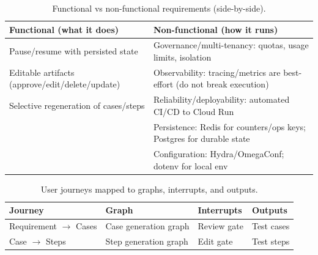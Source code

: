 \begin{table}[htbp]
    \centering
    \small
    \renewcommand{\arraystretch}{1.15}
    \begin{tabularx}{\textwidth}{@{}>{\raggedright\arraybackslash}p{}>{\raggedright\arraybackslash}X@{}}
        \toprule
        \textbf{Functional (what it does)}              & \textbf{Non-functional (how it runs)}                                   \\
        \midrule
        Pause/resume with persisted state               & Governance/multi-tenancy: quotas, usage limits, isolation               \\
        Editable artifacts (approve/edit/delete/update) & Observability: tracing/metrics are best-effort (do not break execution) \\
        Selective regeneration of cases/steps           & Reliability/deployability: automated CI/CD to Cloud Run                 \\
                                                        & Persistence: Redis for counters/ops keys; Postgres for durable state    \\
                                                        & Configuration: Hydra/OmegaConf; dotenv for local env                    \\
        \bottomrule
    \end{tabularx}
    \caption{Functional vs non-functional requirements (side-by-side).}
    \label{tab:requirements_side_by_side}
\end{table}


\begin{table}[htbp]
    \centering
    \label{tab:JourneyGraphMapping}
    \begin{tabular}{llll}
        \toprule
        \textbf{Journey}                & \textbf{Graph}        & \textbf{Interrupts} & \textbf{Outputs} \\
        \midrule
        Requirement $\rightarrow$ Cases & Case generation graph & Review gate         & Test cases       \\
        Case $\rightarrow$ Steps        & Step generation graph & Edit gate           & Test steps       \\
        \bottomrule
    \end{tabular}
    \caption{User journeys mapped to graphs, interrupts, and outputs.}
\end{table}

